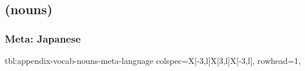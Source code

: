 \documentclass[../nihongo-gakushuu-kyouzai.tex]{subfiles}
\begin{document}
\appendix
\setcounter{section}{2}
\setcounter{subsection}{1}

\subsection{ (nouns)}

\subsubsection{Meta: Japanese}
{tbl:appendix-vocab-nouns-meta-language}  %
{}  %
{
    colspec={X[-3,l]X[3,l]X[-3,l]},
    rowhead=1,
}  %
\end{document}
